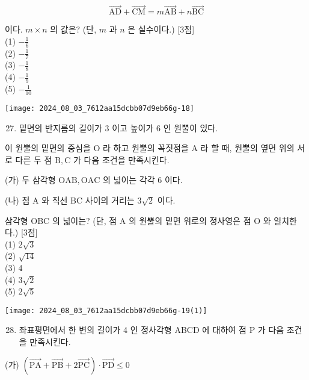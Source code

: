\documentclass[10pt]{article}
\begin{document}
\[
\overrightarrow{\mathrm{AD}}+\overrightarrow{\mathrm{CM}}=m \overrightarrow{\mathrm{AB}}+n \overrightarrow{\mathrm{BC}}
\]

이다. \(m \times n\) 의 값은? (단, \(m\) 과 \(n\) 은 실수이다.) [3점]\\
(1) \(-\frac{1}{6}\)\\
(2) \(-\frac{1}{7}\)\\
(3) \(-\frac{1}{8}\)\\
(4) \(-\frac{1}{9}\)\\
(5) \(-\frac{1}{10}\)

\begin{center}
\texttt{[image: 2024\_08\_03\_7612aa15dcbb07d9eb66g-18]}
\end{center}

\begin{enumerate}
  \setcounter{enumi}{26}
  \item 밑면의 반지름의 길이가 3 이고 높이가 6 인 원뿔이 있다.
\end{enumerate}

이 원뿔의 밑면의 중심을 O 라 하고 원뿔의 꼭짓점을 A 라 할 때, 원뿔의 옆면 위의 서로 다른 두 점 \(\mathrm{B}, \mathrm{C}\) 가 다음 조건을 만족시킨다.

(가) 두 삼각형 \(\mathrm{OAB}, \mathrm{OAC}\) 의 넓이는 각각 6 이다.

(나) 점 A 와 직선 BC 사이의 거리는 \(3 \sqrt{2}\) 이다.

삼각형 OBC 의 넓이는? (단, 점 A 의 원뿔의 밑면 위로의 정사영은 점 O 와 일치한다.) [3점]\\
(1) \(2 \sqrt{3}\)\\
(2) \(\sqrt{14}\)\\
(3) 4\\
(4) \(3 \sqrt{2}\)\\
(5) \(2 \sqrt{5}\)

\begin{center}
\texttt{[image: 2024\_08\_03\_7612aa15dcbb07d9eb66g-19(1)]}
\end{center}

\begin{enumerate}
  \setcounter{enumi}{27}
  \item 좌표평면에서 한 변의 길이가 4 인 정사각형 ABCD 에 대하여 점 P 가 다음 조건을 만족시킨다.
\end{enumerate}

(가) \((\overrightarrow{\mathrm{PA}}+\overrightarrow{\mathrm{PB}}+2 \overrightarrow{\mathrm{PC}}) \cdot \overrightarrow{\mathrm{PD}} \leq 0\)
\end{document}
